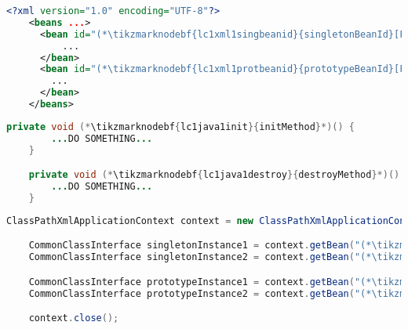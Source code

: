 \example
\begin{lstlisting}[language=XML, title={Configuration XML}]
    <?xml version="1.0" encoding="UTF-8"?>
    <beans ...>
      <bean id="(*\tikzmarknodebf{lc1xml1singbeanid}{singletonBeanId}[ForestGreen]*)" class="somepackage.subpackage.CommonClass" init-method="(*\tikzmarknodebf{lc1xml1singinit}{initMethod}[ForestGreen]*)" destroy-method="(*\tikzmarknodebf{lc1xml1singdestroy}{destroyMethod}[ForestGreen]*)">
          ...
      </bean>
      <bean id="(*\tikzmarknodebf{lc1xml1protbeanid}{prototypeBeanId}[ForestGreen]*)" class="somepackage.subpackage.CommonClass" scope="prototype" init-method="(*\tikzmarknodebf{lc1xml1protinit}{initMethod}[ForestGreen]*)" destroy-method="(*\tikzmarknodebf{lc1xml1protdestroy}{destroyMethod}[ForestGreen]*)">
        ...
      </bean>
    </beans>
\end{lstlisting}
\begin{lstlisting}[language=Java, title={Snippet of a common bean class}]
    private void (*\tikzmarknodebf{lc1java1init}{initMethod}*)() {
        ...DO SOMETHING...
    }

    private void (*\tikzmarknodebf{lc1java1destroy}{destroyMethod}*)() {
        ...DO SOMETHING...
    }
\end{lstlisting}
\begin{lstlisting}[language=Java, title={Usage}]
    ClassPathXmlApplicationContext context = new ClassPathXmlApplicationContext("configurationFile.xml");

    CommonClassInterface singletonInstance1 = context.getBean("(*\tikzmarknodebf{lc1java2singbeanid1}{singletonBeanId}[ForestGreen]*)", CommonClassInterface.class);
    CommonClassInterface singletonInstance2 = context.getBean("(*\tikzmarknodebf{lc1java2singbeanid2}{singletonBeanId}[ForestGreen]*)", CommonClassInterface.class);

    CommonClassInterface prototypeInstance1 = context.getBean("(*\tikzmarknodebf{lc1java2protbeanid1}{prototypeBeanId}[ForestGreen]*)", CommonClassInterface.class);
    CommonClassInterface prototypeInstance2 = context.getBean("(*\tikzmarknodebf{lc1java2protbeanid2}{prototypeBeanId}[ForestGreen]*)", CommonClassInterface.class);

    context.close();
\end{lstlisting}

